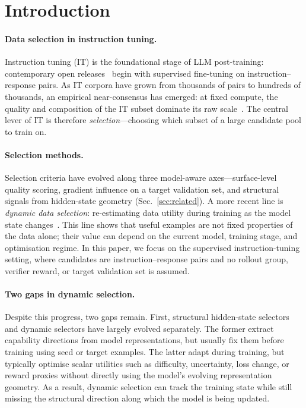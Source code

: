 \section{Introduction}
\label{sec:intro}

\paragraph{Data selection in instruction tuning.}
Instruction tuning (IT) is the foundational stage of LLM
post-training: contemporary open releases~\cite{dubey2024llama3,
lambert2024tulu3,qwen2025} begin with supervised fine-tuning on
instruction--response pairs. As IT corpora have grown from thousands
of pairs to hundreds of thousands, an empirical near-consensus has
emerged: at fixed compute, the quality and composition of the IT
subset dominate its raw scale~\cite{zhou2023lima,zhang2025jair,
qin2024datatsunami}. The central lever of IT is therefore
\emph{selection}---choosing which subset of a large candidate pool
to train on.

\paragraph{Selection methods.}
Selection criteria have evolved along three model-aware
axes---surface-level quality scoring, gradient influence on a
target validation set, and structural signals from hidden-state
geometry (Sec.~\ref{sec:related}). A more recent line is
\emph{dynamic data selection}: re-estimating data utility during
training as the model state changes~\cite{kung2023activeit,
sun2025dots}. This line shows that useful examples are not fixed
properties of the data alone; their value can depend on the current
model, training stage, and optimisation regime. In this paper, we
focus on the supervised instruction-tuning setting, where candidates
are instruction--response pairs and no rollout group, verifier
reward, or target validation set is assumed.

\paragraph{Two gaps in dynamic selection.}
Despite this progress, two gaps remain. First, structural
hidden-state selectors and dynamic selectors have largely evolved
separately. The former extract capability directions from model
representations, but usually fix them before training using seed or
target examples. The latter adapt during training, but typically
optimise scalar utilities such as difficulty, uncertainty, loss
change, or reward proxies without directly using the model's
evolving representation geometry. As a result, dynamic selection can
track the training state while still missing the structural direction
along which the model is being updated.

